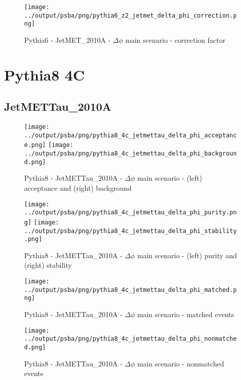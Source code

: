 \documentclass[11pt]{book}
\begin{document}
\begin{figure}[ht]
\centering
\texttt{[image: ../output/psba/png/pythia6\_z2\_jetmet\_delta\_phi\_correction.png]}
\caption{Pythia6 - JetMET\_2010A - $\Delta\phi$ main scenario - correction factor}
\label{fig:p6_jetmet_delta_phi_correction}
\end{figure}

\clearpage
\section{Pythia8 4C}
\subsection{JetMETTau\_2010A}

\begin{figure}[ht]
\centering
\texttt{[image: ../output/psba/png/pythia8\_4c\_jetmettau\_delta\_phi\_acceptance.png]}
\texttt{[image: ../output/psba/png/pythia8\_4c\_jetmettau\_delta\_phi\_background.png]}
\caption{Pythia8 - JetMETTau\_2010A - $\Delta\phi$ main scenario - (left) acceptance and (right) background}
\label{fig:p8_jetmettau_delta_phi_ab}
\end{figure}

\begin{figure}[ht]
\centering
\texttt{[image: ../output/psba/png/pythia8\_4c\_jetmettau\_delta\_phi\_purity.png]}
\texttt{[image: ../output/psba/png/pythia8\_4c\_jetmettau\_delta\_phi\_stability.png]}
\caption{Pythia8 - JetMETTau\_2010A - $\Delta\phi$ main scenario - (left) purity and (right) stability}
\label{fig:p8_jetmettau_delta_phi_ps}
\end{figure}

\begin{figure}[ht]
\centering
\texttt{[image: ../output/psba/png/pythia8\_4c\_jetmettau\_delta\_phi\_matched.png]}
\caption{Pythia8 - JetMETTau\_2010A - $\Delta\phi$ main scenario - matched events}
\label{fig:p8_jetmettau_delta_phi_matched}
\end{figure}

\begin{figure}[ht]
\centering
\texttt{[image: ../output/psba/png/pythia8\_4c\_jetmettau\_delta\_phi\_nonmatched.png]}
\caption{Pythia8 - JetMETTau\_2010A - $\Delta\phi$ main scenario - nonmatched events}
\label{fig:p8_jetmettau_delta_phi_nonmatched}
\end{figure}
\end{document}
